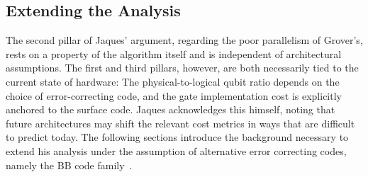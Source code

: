 \subsection{Extending the Analysis}
The second pillar of Jaques' argument, regarding the poor parallelism of Grover's, rests on a property of the algorithm itself and is independent of architectural assumptions. The first and third pillars, however, are both necessarily tied to the current state of hardware: The physical-to-logical qubit ratio depends on the choice of error-correcting code, and the gate implementation cost is explicitly anchored to the surface code. Jaques acknowledges this himself, noting that future architectures may shift the relevant cost metrics in ways that are difficult to predict today. %
The following sections introduce the background necessary to extend his analysis under the assumption of alternative error correcting codes, namely the BB code family~\cite{Bravyi2024}.












